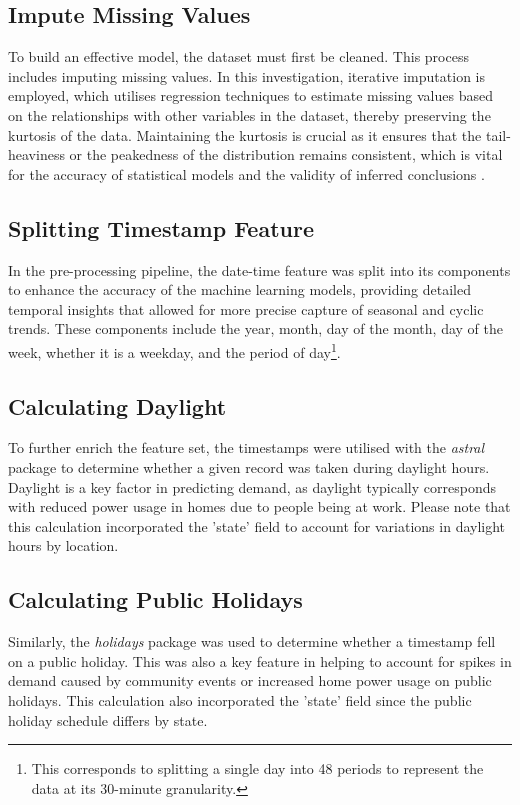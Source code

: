 \documentclass[mstat,12pt]{unswthesis}
\begin{document}
\hypertarget{impute-missing}{%
\subsection{Impute Missing Values}\label{impute-missing}}
To build an effective model, the dataset must first be cleaned. This process includes imputing missing values. In this investigation, iterative imputation is employed, which utilises regression techniques to estimate missing values based on the relationships with other variables in the dataset, thereby preserving the kurtosis of the data. Maintaining the kurtosis is crucial as it ensures that the tail-heaviness or the peakedness of the distribution remains consistent, which is vital for the accuracy of statistical models and the validity of inferred conclusions \cite{Hoque2021}.

\hypertarget{split-datetime}{%
\subsection{Splitting Timestamp Feature}\label{split-datetime}}
In the pre-processing pipeline, the date-time feature was split into its components to enhance the accuracy of the machine learning models, providing detailed temporal insights that allowed for more precise capture of seasonal and cyclic trends. These components include the year, month, day of the month, day of the week, whether it is a weekday, and the period of day\footnote{This corresponds to splitting a single day into 48 periods to represent the data at its 30-minute granularity.}.

\hypertarget{calculate-daylight}{%
\subsection{Calculating Daylight}\label{calculate-daylight}}
To further enrich the feature set, the timestamps were utilised with the \textit{astral} package to determine whether a given record was taken during daylight hours. Daylight is a key factor in predicting demand, as daylight typically corresponds with reduced power usage in homes due to people being at work. Please note that this calculation incorporated the 'state' field to account for variations in daylight hours by location.

\hypertarget{calculate-public-holiday}{%
\subsection{Calculating Public Holidays}\label{calculate-public-holiday}}
Similarly, the \textit{holidays} package was used to determine whether a timestamp fell on a public holiday. This was also a key feature in helping to account for spikes in demand caused by community events or increased home power usage on public holidays. This calculation also incorporated the 'state' field since the public holiday schedule differs by state.
\end{document}
